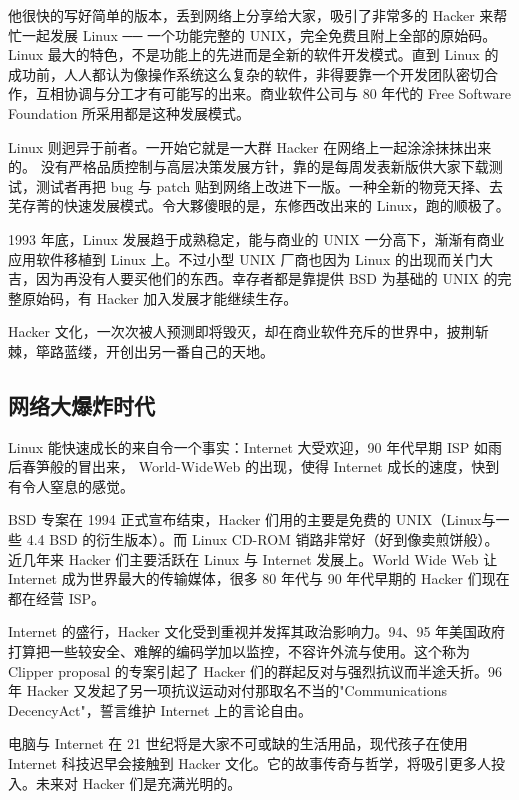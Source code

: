 他很快的写好简单的版本，丢到网络上分享给大家，吸引了非常多的 Hacker 来帮忙一起发展 Linux ── 一个功能完整的 UNIX，完全免费且附上全部的原始码。 Linux 最大的特色，不是功能上的先进而是全新的软件开发模式。直到 Linux 的成功前，人人都认为像操作系统这么复杂的软件，非得要靠一个开发团队密切合作，互相协调与分工才有可能写的出来。商业软件公司与 80 年代的 Free Software Foundation 所采用都是这种发展模式。

Linux 则迥异于前者。一开始它就是一大群 Hacker 在网络上一起涂涂抹抹出来的。 没有严格品质控制与高层决策发展方针，靠的是每周发表新版供大家下载测试，测试者再把 bug 与 patch 贴到网络上改进下一版。一种全新的物竞天择、去芜存菁的快速发展模式。令大夥傻眼的是，东修西改出来的 Linux，跑的顺极了。

1993 年底，Linux 发展趋于成熟稳定，能与商业的 UNIX 一分高下，渐渐有商业应用软件移植到 Linux 上。不过小型 UNIX 厂商也因为 Linux 的出现而关门大吉，因为再没有人要买他们的东西。幸存者都是靠提供 BSD 为基础的 UNIX 的完整原始码，有 Hacker 加入发展才能继续生存。

Hacker 文化，一次次被人预测即将毁灭，却在商业软件充斥的世界中，披荆斩棘，筚路蓝缕，开创出另一番自己的天地。

\subsection{网络大爆炸时代}

Linux 能快速成长的来自令一个事实：Internet 大受欢迎，90 年代早期 ISP 如雨后春笋般的冒出来， World-WideWeb 的出现，使得 Internet 成长的速度，快到有令人窒息的感觉。

BSD 专案在 1994 正式宣布结束，Hacker 们用的主要是免费的 UNIX（Linux与一些 4.4 BSD 的衍生版本）。而 Linux CD-ROM 销路非常好（好到像卖煎饼般）。近几年来 Hacker 们主要活跃在 Linux 与 Internet 发展上。World Wide Web 让 Internet 成为世界最大的传输媒体，很多 80 年代与 90 年代早期的 Hacker 们现在都在经营 ISP。

Internet 的盛行，Hacker 文化受到重视并发挥其政治影响力。94、95 年美国政府打算把一些较安全、难解的编码学加以监控，不容许外流与使用。这个称为 Clipper proposal 的专案引起了 Hacker 们的群起反对与强烈抗议而半途夭折。96 年 Hacker 又发起了另一项抗议运动对付那取名不当的"Communications DecencyAct"，誓言维护 Internet 上的言论自由。

电脑与 Internet 在 21 世纪将是大家不可或缺的生活用品，现代孩子在使用 Internet 科技迟早会接触到 Hacker 文化。它的故事传奇与哲学，将吸引更多人投入。未来对 Hacker 们是充满光明的。

